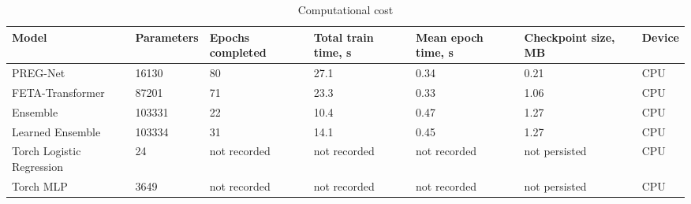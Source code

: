 \begin{table}[ht]
\centering
\caption{Computational cost}
\label{tab:computational-cost}
\begin{tabular}{lllllll}
\hline
Model & Parameters & Epochs completed & Total train time, s & Mean epoch time, s & Checkpoint size, MB & Device \\
\hline
PREG-Net & 16130 & 80 & 27.1 & 0.34 & 0.21 & CPU \\
FETA-Transformer & 87201 & 71 & 23.3 & 0.33 & 1.06 & CPU \\
Ensemble & 103331 & 22 & 10.4 & 0.47 & 1.27 & CPU \\
Learned Ensemble & 103334 & 31 & 14.1 & 0.45 & 1.27 & CPU \\
Torch Logistic Regression & 24 & not recorded & not recorded & not recorded & not persisted & CPU \\
Torch MLP & 3649 & not recorded & not recorded & not recorded & not persisted & CPU \\
\hline
\end{tabular}
\end{table}
